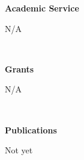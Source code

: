 \documentclass[final]{article}
\begin{document}
	\begin{minipage}[t]{.20\textwidth}
		\Large{\textbf{Academic Service }}\\
	\end{minipage}
	\begin{minipage}[t]{.80\textwidth}
		 N/A
	\end{minipage}\\

	\begin{minipage}[t]{.20\textwidth}
		\Large{\textbf{Grants}}\\
	\end{minipage}
	\begin{minipage}[t]{.80\textwidth}
		 N/A
	\end{minipage}\\
		
	\begin{minipage}[t]{.20\textwidth}
		\Large{\textbf{Publications}}\\
	\end{minipage}
	\begin{minipage}[t]{.80\textwidth}
		 Not yet
	\end{minipage}\\
\end{document}
